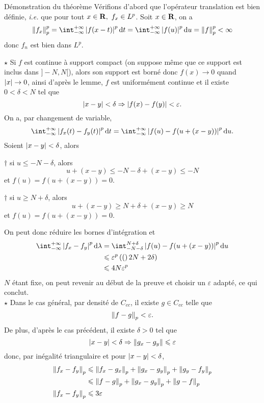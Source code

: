 \documentclass[a4paper,11pt, twoside]{article}
\begin{document}
\begin{ProofC}{Démonstration du théorème}
  Vérifions d'abord que l'opérateur translation est bien définie, \emph{i.e.} que pour tout $x\in\mathbf R,\ f_x\in L^p$. Soit $x\in\mathbf R$, on a 
  $$\norm{f_x}_p^p=\int_{-\infty}^{+\infty}\abs{f(x-t)}^p\dt=\int_{-\infty}^{+\infty}\abs{f(u)}^p\mathrm du=\norm{f}_p^p<\infty$$
  donc $f_n$ est bien dans $L^p$.

  $\star$ Si $f$ est continue à support compact (on suppose même que ce support est inclus dans $]-N,N[$), alors son support est borné donc $f(x)\longrightarrow 0$ quand $\left| x\right|\to 0$, ainsi d'après le lemme, $f$ est uniformément continue et il existe $0<\delta<N$ tel que 
  $$\left| x-y\right|<\delta\Rightarrow \left| f(x)-f(y)\right|<\varepsilon.$$
  On a, par changement de variable,
  $$\intI \abs{f_x(t)-f_y(t)}^p\dt=\intI\abs{f(u)-f(u+(x-y))}^p\mathrm du.$$
  Soient $\left| x-y\right|<\delta$, alors

  $\dagger$ si $u\leqslant -N-\delta$, alors 
  $$u+(x-y)\leqslant  -N-\delta+(x-y)\leqslant -N$$
  et $f(u)=f(u+(x-y))=0$.

  $\dagger$ si $u\geqslant N+\delta$, alors 
  $$u+(x-y)\geqslant N+\delta+(x-y)\geqslant N$$
  et $f(u)=f(u+(x-y))=0$.

  On peut donc réduire les bornes d'intégration et 
  \begin{align*}
    \intI\abs{f_x-f_y}^p\mathrm d\lambda&=\int_{-N-\delta}^{N+\delta}\abs{f(u)-f(u+(x-y))}^p\mathrm du\\
    &\leqslant \varepsilon^p\Par(2N+2\delta)\\
    &\leqslant 4N\varepsilon^p
  \end{align*}
  $N$ étant fixe, on peut revenir au début de la preuve et choisir un $\varepsilon$ adapté, ce qui conclut.\\

  $\star$ Dans le cas général, par densité de $C_{cc}$, il existe $g\in C_{cc}$ telle que 
  $$\left\lVert f-g\right\rVert_p<\varepsilon.$$
  De plus, d'après le cas précédent, il existe $\delta>0$ tel que 
  $$\left| x-y\right|<\delta\Rightarrow\left\lVert g_x-g_y\right\rVert\leqslant \varepsilon$$
  donc, par inégalité triangulaire et pour $\left| x-y\right|<\delta$,
  \begin{align*}
    \left\lVert f_x-f_y\right\rVert_p&\leqslant \left\lVert f_x-g_x\right\rVert_p+\left\lVert g_x-g_y\right\rVert_p+\left\lVert g_y-f_y\right\rVert_p\\
    &\leqslant \left\lVert f-g\right\rVert_p+\left\lVert g_x-g_y\right\rVert_p+\left\lVert g-f\right\rVert_p\\
    \left\lVert f_x-f_y\right\rVert_p&\leqslant 3\varepsilon
  \end{align*}
\end{ProofC}
\end{document}

